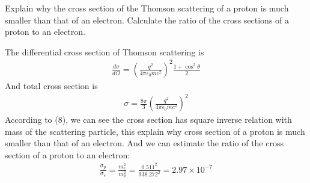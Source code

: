 \documentclass[answers]{exam}
\begin{document}
\begin{questions}
\question  Explain why the cross section of the Thomson scattering of a proton is much smaller than that of an electron. Calculate the ratio of the cross sections of a proton to an electron.
\begin{solution}
The differential cross section of Thomson scattering is 
\begin{align*}
\frac{d \sigma}{d \Omega}=\left(\frac{q^{2}}{4 \pi \varepsilon_{0} m c^{2}}\right)^{2} \frac{1+\cos ^{2} \theta}{2}
\end{align*}
And total cross section is 
\begin{align}
\sigma=\frac{8 \pi}{3}\left(\frac{q^{2}}{4 \pi \varepsilon_{0} m c^{2}}\right)^{2}   
\end{align}
According to (8), we can see the cross section has square inverse relation with mass of the scattering particle, this explain why cross section of a proton is much smaller than that of an electron.
And we can estimate the ratio of the cross section of a proton to an electron:
\begin{align*}
\frac{\sigma_{p}}{\sigma_{e}} = \frac{m_{e}^{2}}{m_{p}^{2}}=\frac{0.511^{2}}{938.272^{2}}=2.97\times 10^{-7}
\end{align*}
\end{solution}








\end{questions}
\end{document}
